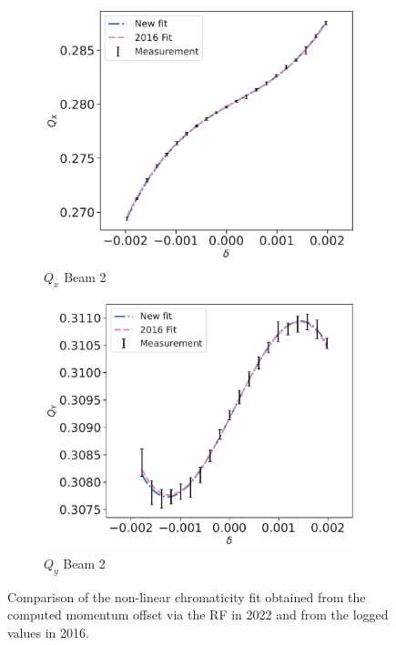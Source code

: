 \begin{figure}[H]
\begin{subfigure}{0.49\textwidth}
    \end{subfigure}
    \\
    \begin{subfigure}{0.49\textwidth}
        \centering
        \includegraphics[width=\textwidth]{./images/chromaticity_2016/B1_qx.pdf}
        \caption{$Q_x$ Beam 2}
        \label{}
    \end{subfigure}
    \hfill
    \begin{subfigure}{0.49\textwidth}
        \centering
        \includegraphics[width=\textwidth]{./images/chromaticity_2016/B2_qy.pdf}
        \caption{$Q_y$ Beam 2}
        \label{}
    \end{subfigure}
    \caption{Comparison of the non-linear chromaticity fit obtained from the computed momentum
    offset via the RF in 2022 and from the logged values in 2016.}
    \label{fig:very_high_orders:bare_chroma_2016}
\end{figure}

